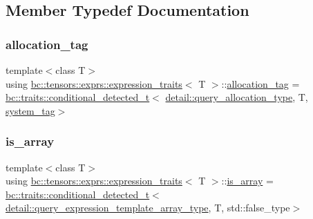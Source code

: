 \subsection{Member Typedef Documentation}
\mbox{\label{structbc_1_1tensors_1_1exprs_1_1expression__traits_ac3601870cb49bcd8048d3321b833a733}} 
\subsubsection{\texorpdfstring{allocation\+\_\+tag}{allocation\_tag}}
{\footnotesize\ttfamily template$<$class T$>$ \\
using \hyperlink{structbc_1_1tensors_1_1exprs_1_1expression__traits}{bc\+::tensors\+::exprs\+::expression\+\_\+traits}$<$ T $>$\+::\hyperlink{structbc_1_1tensors_1_1exprs_1_1expression__traits_ac3601870cb49bcd8048d3321b833a733}{allocation\+\_\+tag} =  \hyperlink{namespacebc_1_1traits_a1a6d378947ec32acd457890854bcd592}{bc\+::traits\+::conditional\+\_\+detected\+\_\+t}$<$ \hyperlink{namespacebc_1_1tensors_1_1exprs_1_1detail_aa48f3a00816d9b230e5f0ce720323f57}{detail\+::query\+\_\+allocation\+\_\+type}, T, \hyperlink{structbc_1_1tensors_1_1exprs_1_1expression__traits_a13a9bbc7ab291f35143c611ff93f69de}{system\+\_\+tag}$>$}

\mbox{\label{structbc_1_1tensors_1_1exprs_1_1expression__traits_a625cfb1838e83a8551e197b56b2ef2e4}} 
\subsubsection{\texorpdfstring{is\+\_\+array}{is\_array}}
{\footnotesize\ttfamily template$<$class T$>$ \\
using \hyperlink{structbc_1_1tensors_1_1exprs_1_1expression__traits}{bc\+::tensors\+::exprs\+::expression\+\_\+traits}$<$ T $>$\+::\hyperlink{structbc_1_1tensors_1_1exprs_1_1expression__traits_a625cfb1838e83a8551e197b56b2ef2e4}{is\+\_\+array} =  \hyperlink{namespacebc_1_1traits_a1a6d378947ec32acd457890854bcd592}{bc\+::traits\+::conditional\+\_\+detected\+\_\+t}$<$ \hyperlink{namespacebc_1_1tensors_1_1exprs_1_1detail_a4f6ef9491d82383737761491907159ae}{detail\+::query\+\_\+expression\+\_\+template\+\_\+array\+\_\+type}, T, std\+::false\+\_\+type$>$}

